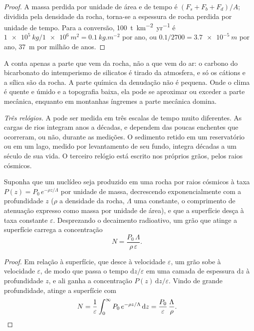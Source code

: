 \begin{proof}
A massa perdida por unidade de área e de tempo é $(F_s + F_b + F_d)/A$; dividida pela densidade da rocha, torna-se a espessura de rocha perdida por unidade de tempo. Para a conversão, \qty{100}{t.km^{-2}.yr^{-1}} é
$\qty{1e5}{kg}/\qty{1e6}{m^2} = \qty{0.1}{kg.m^{-2}}$ por ano, ou
$0.1/2700 = \qty{3.7e-5}{m}$ por ano, \qty{37}{m} por milhão de anos.
\end{proof}

A  conta apenas a parte que vem da rocha, não a que vem do ar: o carbono do bicarbonato do intemperismo de silicatos é tirado da atmosfera, e só os cátions e a sílica são da rocha. A parte química da denudação não é pequena. Onde o clima é quente e úmido e a topografia baixa, ela pode se aproximar ou exceder a parte mecânica, enquanto em montanhas íngremes a parte mecânica domina.

\emph{Três relógios.} A  pode ser medida em três escalas de tempo muito diferentes. As cargas de rios integram anos a décadas, e dependem das poucas enchentes que ocorreram, ou não, durante as medições. O sedimento retido em um reservatório ou em um lago, medido por levantamento de seu fundo, integra décadas a um século de sua vida. O terceiro relógio está escrito nos próprios grãos, pelos raios cósmicos.

\begin{proposition}\label{prop:b1:erosion-transport:cosmogenic}
Suponha que um nuclídeo seja produzido em uma rocha por raios cósmicos à taxa $P(z) = P_0\,e^{-\rho z/\Lambda}$ por unidade de massa, decrescendo exponencialmente com a profundidade $z$ ($\rho$ a densidade da rocha, $\Lambda$ uma constante, o comprimento de atenuação expresso como massa por unidade de área), e que a superfície desça à taxa constante $\varepsilon$. Desprezando o decaimento radioativo, um grão que atinge a superfície carrega a concentração
\[
  N = \frac{P_0\,\Lambda}{\rho\,\varepsilon}.
\]
\end{proposition}

\begin{proof}
Em relação à superfície, que desce à velocidade $\varepsilon$, um grão sobe à velocidade $\varepsilon$, de modo que passa o tempo $\mathrm dz/\varepsilon$ em uma camada de espessura $\mathrm dz$ à profundidade $z$, e ali ganha a concentração $P(z)\,\mathrm dz/\varepsilon$. Vindo de grande profundidade, atinge a superfície com
\[
  N = \frac{1}{\varepsilon}\int_0^{\infty} P_0\,e^{-\rho z/\Lambda}\,\mathrm dz
  = \frac{P_0}{\varepsilon}\,\frac{\Lambda}{\rho}. \qedhere
\]
\end{proof}

